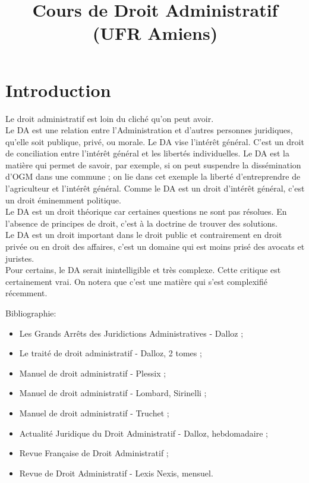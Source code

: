 \documentclass[10pt, a4paper, openany]{book}
\date{}
\title{Cours de Droit Administratif (UFR Amiens)}
\begin{document}
\maketitle
\tableofcontents

\chapter{Introduction}

Le droit administratif est loin du cliché qu'on peut avoir. \\
Le DA est une relation entre l'Administration et d'autres personnes juridiques, qu'elle soit publique, privé, ou morale. Le DA vise l'intérêt général. C'est un droit de conciliation entre l'intérêt général et les libertés individuelles. Le DA est la matière qui permet de savoir, par exemple, si on peut suspendre la dissémination d'OGM dans une commune ; on lie dans cet exemple la liberté d'entreprendre de l'agriculteur et l'intérêt général. Comme le DA est un droit d'intérêt général, c'est un droit éminemment politique. \\
Le DA est un droit théorique car certaines questions ne sont pas résolues. En l'absence de principes de droit, c'est à la doctrine de trouver des solutions. \\
Le DA est un droit important dans le droit public et contrairement en droit privée ou en droit des affaires, c'est un domaine qui est moins prisé des avocats et juristes. \\
Pour certains, le DA serait inintelligible et très complexe. Cette critique est certainement vrai. On notera que c'est une matière qui s'est complexifié récemment. 


Bibliographie:
\begin{itemize}
\item Les Grands Arrêts des Juridictions Administratives - Dalloz ;
\item Le traité de droit administratif - Dalloz, 2 tomes ;
\item Manuel de droit administratif - Plessix ;
\item Manuel de droit administratif - Lombard, Sirinelli ;
\item Manuel de droit administratif - Truchet ;
\item Actualité Juridique du Droit Administratif - Dalloz, hebdomadaire ;
\item Revue Française de Droit Administratif ;
\item Revue de Droit Administratif - Lexis Nexis, mensuel.
\end{itemize}
\end{document}
